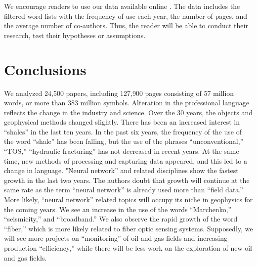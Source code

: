 \documentclass[geosciences,article,submit,moreauthors,pdftex]{Definitions/mdpi}
\begin{document}
We encourage readers to use our data available online \citep{Eltsov2020}. The data includes the filtered word lists with the frequency of use each year, the number of pages, and the average number of co-authors. Thus, the reader will be able to conduct their research, test their hypotheses or assumptions.


\section{Conclusions}

We analyzed 24,500 papers, including 127,900 pages consisting of 57 million words, or more than 383 million symbols. Alteration in the professional language reflects the change in the industry and science. Over the 30 years, the objects and geophysical methods changed slightly. There has been an increased interest in ``shales'' in the last ten years. In the past six years, the frequency of the use of the word ``shale'' has been falling, but the use of the phrases ``unconventional,'' ``TOS,'' ``hydraulic fracturing'' has not decreased in recent years. At the same time, new methods of processing and capturing data appeared, and this led to a change in language. "Neural network'' and related disciplines show the fastest growth in the last two years. The authors doubt that growth will continue at the same rate as the term ``neural network'' is already used more than ``field data.'' More likely, ``neural network'' related topics will occupy its niche in geophysics for the coming years. We see an increase in the use of the words ``Marchenko,'' ``seismicity,'' and ``broadband.'' We also observe the rapid growth of the word ``fiber,'' which is more likely related to fiber optic sensing systems. Supposedly, we will see more projects on ``monitoring'' of oil and gas fields and increasing production ``efficiency,'' while there will be less work on the exploration of new oil and gas fields.
 

\vspace{6pt} 


\end{document}
